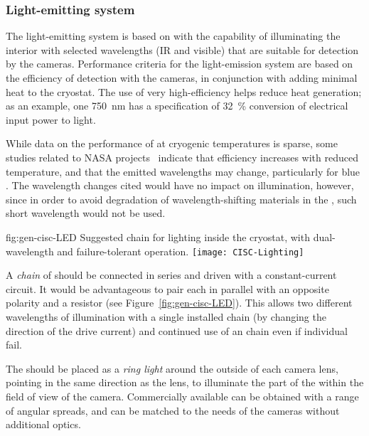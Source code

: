 \subsubsection{Light-emitting system}
The light-emitting system is based on  with the capability of illuminating the interior with selected
wavelengths (IR and visible) that are suitable for detection by the
cameras.  Performance criteria for the light-emission system are based
on the efficiency of detection with the cameras, in conjunction with
adding minimal heat to the cryostat. The use of very high-efficiency
helps reduce heat generation; as an
example, one \SI{750}{nm}  has a specification of
\SI{32}{\%} conversion of electrical input power to light.

While data on the performance of  at cryogenic temperatures is sparse,
some studies related to NASA projects~\cite{Carron:2017zzz} 
indicate that  efficiency increases with reduced temperature,
and that the emitted wavelengths may change, particularly for blue .
The wavelength changes cited would have no impact on illumination, however, since
in order  to avoid degradation of wavelength-shifting materials in the ,
such short wavelength  would not be used.

\begin{dunefigure}{fig:gen-cisc-LED}
  {Suggested  chain for lighting inside the cryostat, with
    dual-wavelength and failure-tolerant operation.}
\texttt{[image: CISC-Lighting]}
\end{dunefigure}

A \textit{chain} of  should be connected in series and driven with a
constant-current circuit. It would be advantageous to pair each
 in parallel with an opposite polarity  and a resistor
(see Figure~\ref{fig:gen-cisc-LED}).
This allows two different wavelengths of illumination with a single installed
chain (by changing the direction of the drive current) and 
continued use of an  chain even if individual  fail.

The  should be placed as a \textit{ring light} around the outside of each
camera lens, pointing in the same direction as the lens, to 
illuminate the part of the  within the field of
view of the camera. Commercially available  can be obtained with
a range of angular spreads, and can be matched to the needs of the
cameras without additional optics. 

